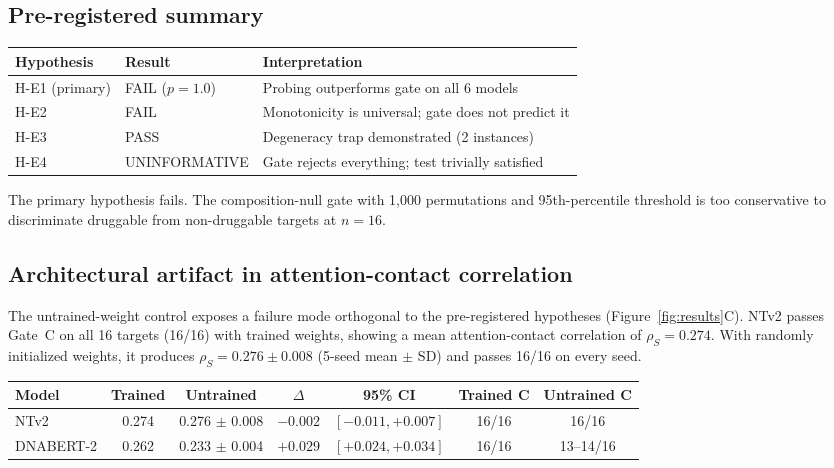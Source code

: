 \documentclass[11pt]{article}
\begin{document}
\subsection{Pre-registered summary}

\begin{center}
\begin{tabular}{lll}
\toprule
\textbf{Hypothesis} & \textbf{Result} & \textbf{Interpretation} \\
\midrule
H-E1 (primary)   & FAIL ($p = 1.0$)    & Probing outperforms gate on all 6 models \\
H-E2              & FAIL                & Monotonicity is universal; gate does not predict it \\
H-E3              & PASS                & Degeneracy trap demonstrated (2 instances) \\
H-E4              & UNINFORMATIVE       & Gate rejects everything; test trivially satisfied \\
\bottomrule
\end{tabular}
\end{center}

The primary hypothesis fails. The composition-null gate with 1,000
permutations and 95th-percentile threshold is too conservative to discriminate
druggable from non-druggable targets at $n = 16$.

\subsection{Architectural artifact in attention-contact correlation}

The untrained-weight control exposes a failure mode orthogonal to the
pre-registered hypotheses (Figure~\ref{fig:results}C). NTv2 passes Gate~C
on all 16 targets (16/16) with trained weights, showing a mean
attention-contact correlation of $\rho_S = 0.274$. With randomly initialized weights, it produces $\rho_S = 0.276 \pm
0.008$ (5-seed mean $\pm$ SD) and passes 16/16 on every seed.

\begin{center}
\begin{tabular}{lcccccc}
\toprule
\textbf{Model} & \textbf{Trained} & \textbf{Untrained} & \textbf{$\Delta$} & \textbf{95\% CI} & \textbf{Trained C} & \textbf{Untrained C} \\
\midrule
NTv2     & 0.274 & 0.276 $\pm$ 0.008 & $-0.002$ & $[-0.011, +0.007]$ & 16/16 & 16/16 \\
DNABERT-2 & 0.262 & 0.233 $\pm$ 0.004 & $+0.029$ & $[+0.024, +0.034]$ & 16/16 & 13--14/16 \\
\bottomrule
\end{tabular}
\end{center}
\end{document}

